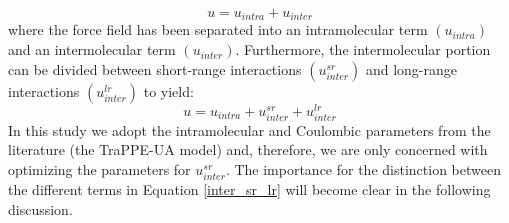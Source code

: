\documentclass[12pt]{article}
\begin{document}
\begin{equation}
u = u_{intra} + u_{inter}
\end{equation}
where the force field has been separated into an intramolecular term $(u_{intra})$ and an intermolecular term $(u_{inter})$. Furthermore, the intermolecular portion can be divided between short-range interactions $(u_{inter}^{sr})$ and long-range interactions $(u_{inter}^{lr})$ to yield:
\begin{equation} \label{inter_sr_lr}
u = u_{intra} + u_{inter}^{sr} + u_{inter}^{lr}
\end{equation}
In this study we adopt the intramolecular and Coulombic parameters from the literature (the TraPPE-UA model) and, therefore, we are only concerned with optimizing the parameters for $u_{inter}^{sr}$. The importance for the distinction between the different terms in Equation \ref{inter_sr_lr} will become clear in the following discussion.
\end{document}
